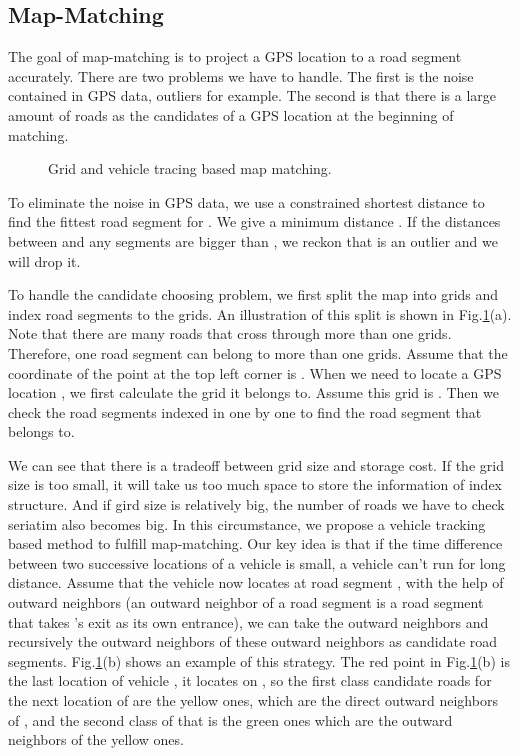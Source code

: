 \documentclass[twocolumn,10pt,final,conference]{IEEEtran}
\begin{document}
\subsection{ Map-Matching}\label{section-Map Matching}
The goal of map-matching is to project a GPS location to a road segment accurately. There are two problems we have to handle. The first is the noise contained in GPS data, outliers for example. The second is that there is a large amount of roads as the candidates of a GPS location at the beginning of matching.

\begin{figure}[h]
\centering
{}
\caption{Grid and vehicle tracing based map matching.}
\label{fig-Map Matching}
\end{figure}
To eliminate the noise in GPS data, we use a constrained shortest distance to find the fittest road segment for . We give a minimum distance . If the distances between  and any segments are bigger than , we reckon that  is an outlier and we will drop it.

To handle the candidate choosing  problem, we first split the map into grids and index road segments to the grids.
An illustration of this split is shown in Fig.\ref{fig-Map Matching}(a).
Note that there are many roads that cross through more than one grids. Therefore, one road segment can belong to more than one grids.
Assume that the coordinate of the point at the top left corner is . When we need to locate a GPS location , we first calculate the grid it belongs to. Assume this grid is . Then we check the road segments indexed in  one by one to find the road segment that  belongs to.



We can see that there is a tradeoff between grid size and storage cost. If the grid size is too small, it will take us too much space to store the information of index structure. And if gird size is relatively big, the number of roads we have to check seriatim also becomes big. In this circumstance, we propose a vehicle tracking based method to fulfill map-matching. Our key idea is that if the time difference between two successive locations of a vehicle is small, a vehicle can't run for long distance. Assume that the vehicle now locates at road segment , with the help of outward neighbors (an outward neighbor of a road segment  is a road segment that takes 's exit as its own entrance), we can take the outward neighbors and recursively the outward neighbors of these outward neighbors as candidate road segments. Fig.\ref{fig-Map Matching}(b) shows an example of this strategy. The red point in Fig.\ref{fig-Map Matching}(b) is the last location of vehicle , it locates on , so the first class candidate roads for the next location of  are the yellow ones, which are the direct outward neighbors of , and the second class of that is the green ones which are the outward neighbors of the yellow ones.
\end{document}

